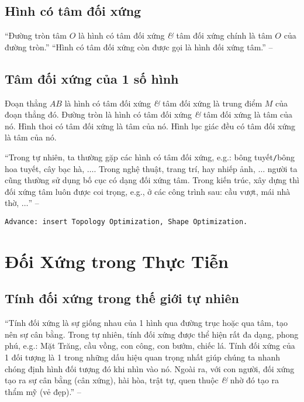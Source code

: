 \documentclass[oneside]{book}
\numberwithin{equation}{section}
\begin{document}
\subsection{Hình có tâm đối xứng}
``Đường tròn tâm $O$ là hình có tâm đối xứng \textit{\&} tâm đối xứng chính là tâm $O$ của đường tròn.'' ``Hình có tâm đối xứng còn được gọi là hình đối xứng tâm.'' -- \cite[p. 111]{Thai_Anh_Dat_Ha_Loan_Nam_Quang_Toan_6_tap_1}

\subsection{Tâm đối xứng của 1 số hình}
Đoạn thẳng $AB$ là hình có tâm đối xứng \textit{\&} tâm đối xứng là trung điểm $M$ của đoạn thẳng đó. Đường tròn là hình có tâm đối xứng \textit{\&} tâm đối xứng là tâm của nó. Hình thoi có tâm đối xứng là tâm của nó. Hình lục giác đều có tâm đối xứng là tâm của nó.

``Trong tự nhiên, ta thường gặp các hình có tâm đối xứng, e.g.: bông tuyết\texttt{/}bông hoa tuyết, cây bạc hà, $\ldots$. Trong nghệ thuật, trang trí, hay nhiếp ảnh, $\ldots$ người ta cũng thường sử dụng bố cục có dạng đối xứng tâm. Trong kiến trúc, xây dựng thì đối xứng tâm luôn được coi trọng, e.g., ở các công trình sau: cầu vượt, mái nhà thờ, $\ldots$'' -- \cite[p. 113]{Thai_Anh_Dat_Ha_Loan_Nam_Quang_Toan_6_tap_1}

\texttt{Advance: insert Topology Optimization, Shape Optimization.}

\section{Đối Xứng trong Thực Tiễn}

\subsection{Tính đối xứng trong thế giới tự nhiên}
``Tính đối xứng là sự giống nhau của 1 hình qua đường trục hoặc qua tâm, tạo nên sự cân bằng. Trong tự nhiên, tính đối xứng được thể hiện rất đa dạng, phong phú, e.g.: Mặt Trăng, cầu vồng, con công, con bướm, chiếc lá. Tính đối xứng của 1 đối tượng là 1 trong những dấu hiệu quan trọng nhất giúp chúng ta nhanh chóng định hình đối tượng đó khi nhìn vào nó. Ngoài ra, với con người, đối xứng tạo ra sự cân bằng (cân xứng), hài hòa, trật tự, quen thuộc \textit{\&} nhờ đó tạo ra thẩm mỹ (vẻ đẹp).'' -- \cite[p. 114]{Thai_Anh_Dat_Ha_Loan_Nam_Quang_Toan_6_tap_1}
\end{document}
